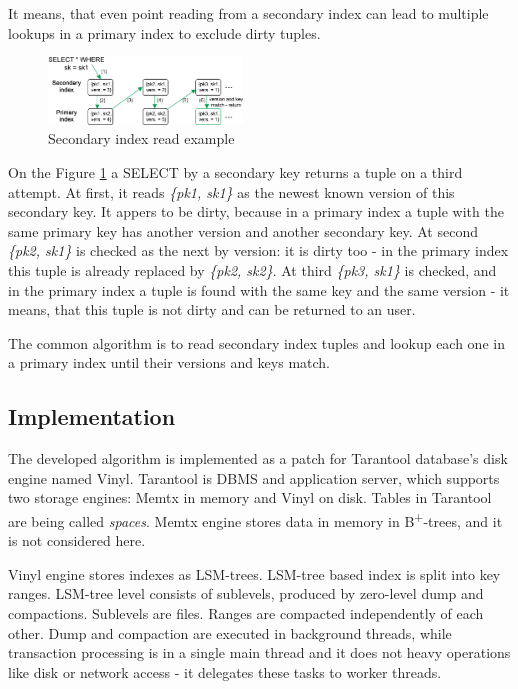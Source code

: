 \documentclass{vldb}
\begin{document}
It means, that even point reading from a secondary index can lead to multiple
lookups in a primary index to exclude dirty tuples.
\begin{figure}
\centering
\includegraphics[width=0.46\textwidth]{secondary_reading_example}
\caption{Secondary index read example}
\label{fig:secondary_reading_example}
\end{figure}
On the Figure \ref{fig:secondary_reading_example} a SELECT by a secondary key
returns a tuple on a third attempt. At first, it reads \textit{\{pk1, sk1\}} as
the newest known version of this secondary key. It appers to be dirty, because
in a primary index a tuple with the same primary key has another version and
another secondary key. At second \textit{\{pk2, sk1\}} is checked as the next
by version: it is dirty too - in the primary index this tuple is already
replaced by \textit{\{pk2, sk2\}}. At third \textit{\{pk3, sk1\}} is checked,
and in the primary index a tuple is found with the same key and the same
version - it means, that this tuple is not dirty and can be returned to an user.

The common algorithm is to read secondary index tuples and lookup each one in a
primary index until their versions and keys match.

\subsection{Implementation}

The developed algorithm is implemented as a patch for Tarantool database's disk
engine named Vinyl. Tarantool is DBMS and application server, which supports two
storage engines: Memtx in memory and Vinyl on disk. Tables in Tarantool are
being called \textit{spaces}. Memtx engine stores data in memory in
B\textsuperscript{+}-trees, and it is not considered here.

Vinyl engine stores indexes as LSM-trees. LSM-tree based index is split into key
ranges. LSM-tree level consists of sublevels, produced by zero-level dump and
compactions. Sublevels are files. Ranges are compacted independently of each
other. Dump and compaction are executed in background threads, while transaction
processing is in a single main thread and it does not heavy operations like disk
or network access - it delegates these tasks to worker threads.
\end{document}
